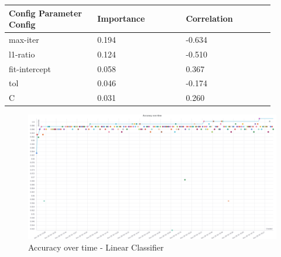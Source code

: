 \documentclass[11pt]{article}
\begin{document}
\begin{appendices}
  \begin{table}[ht]
    \centering
    \begin{tabular}{|p{0.3\linewidth} | p{0.3\linewidth}| p{0.3\linewidth}|} 
      \hline
      \textbf{Config Parameter Config}  & \textbf{Importance} & \textbf{Correlation} \\ \hline
      max-iter & 0.194 & -0.634 \\ \hline
      l1-ratio & 0.124 & -0.510 \\ \hline
      fit-intercept & 0.058 & 0.367 \\ \hline
      tol & 0.046 & -0.174 \\ \hline
      C & 0.031 & 0.260 \\ \hline
    \end{tabular}
  \end{table}\label{LC_ParamImp2}

  \begin{figure}
    \caption {Accuracy over time - Linear Classifier} \label{LCAccOverTime}
    \centering
    \includegraphics[width = \textwidth, height = \textwidth, keepaspectratio]{Images/LC Acc over time.png}
\end{figure}


\end{appendices}
\end{document}
